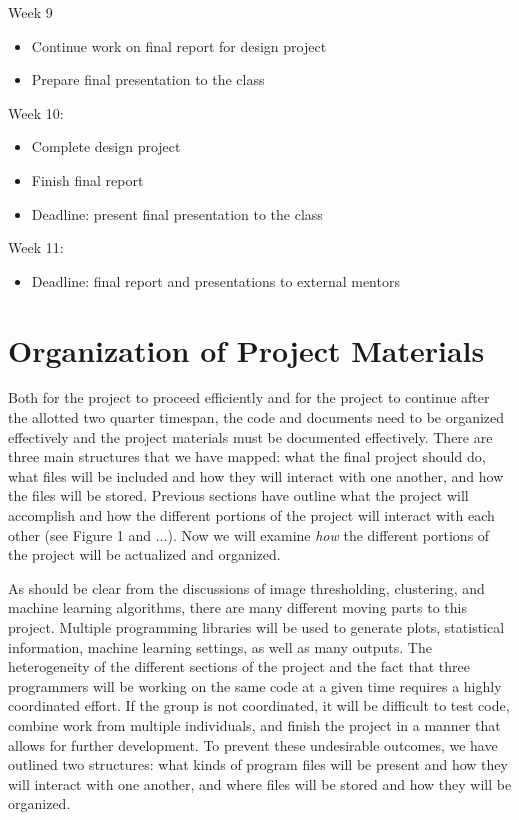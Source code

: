 \documentclass[12pt]{amsart}
\begin{document}
Week 9
\vspace*{-11pt}
\begin{itemize}
	\item Continue work on final report for design project
	\item Prepare final presentation to the class
\end{itemize}

Week 10:
\vspace*{-11pt}
\begin{itemize}
	\item Complete design project
	\item Finish final report 
	\item Deadline: present final presentation to the class
\end{itemize}

Week 11:
\vspace*{-11pt}
\begin{itemize}
	\item Deadline: final report and presentations to external mentors
\end{itemize}






\section*{Organization of Project Materials}

Both for the project to proceed efficiently and for the project to continue after the allotted two quarter timespan, the code and documents need to be organized effectively and the project materials must be documented effectively. There are three main structures that we have mapped: what the final project should do, what files will be included and how they will interact with one another, and how the files will be stored. Previous sections have outline what the project will accomplish and how the different portions of the project will interact with each other (see Figure 1 and $\ldots$). Now we will examine \textit{how} the different portions of the project will be actualized and organized. 

As should be clear from the discussions of image thresholding, clustering, and machine learning algorithms, there are many different moving parts to this project. Multiple programming libraries will be used to generate plots, statistical information, machine learning settings, as well as many outputs. The heterogeneity of the different sections of the project and the fact that three programmers will be working on the same code at a given time requires a highly coordinated effort. If the group is not coordinated, it will be difficult to test code, combine work from multiple individuals, and finish the project in a manner that allows for further development. To prevent these undesirable outcomes, we have outlined two structures: what kinds of program files will be present and how they will interact with one another, and where files will be stored and how they will be organized. 
\end{document}
